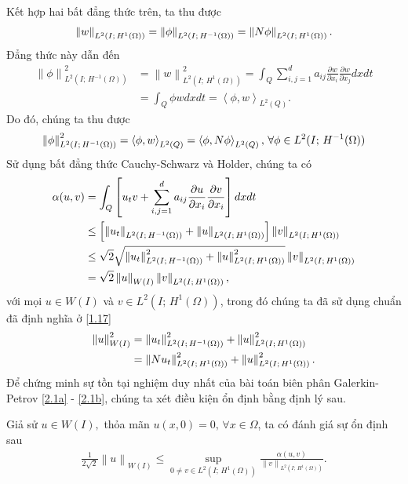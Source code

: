 \documentclass[]{article}
\begin{document}
Kết hợp hai bất đẳng thức trên, ta thu được
\begin{align}\label{2.3}
	\left\|w\right\|_{L^2(I;\, H^1(\Omega))}=\left\|\phi\right\|_{L^2(I;\, H^{-1}(\Omega))}=\left\|\mathnormal{N}\phi\right\|_{L^2(I;\, H^1(\Omega))}.
\end{align}
Đẳng thức này dẫn đến
\begin{align*}
	\left\|\phi\right\|_{L^2(I;\, H^{-1}(\Omega))}^2&=\left\|w\right\|_{L^2(I;\, H^1(\Omega))}^2=\int_{Q}\sum_{i, j=1}^{d}a_{ij}\frac{\partial w}{\partial x_i}\frac{\partial w}{\partial x_j}dxdt\\
	&=\int_{Q}\phi w dxdt=\left\langle\phi, w\right\rangle_{L^2(Q)}.
\end{align*}
Do đó, chúng ta thu được
\begin{align}\label{2.4}
	\left\|\phi\right\|_{L^2(I;\, H^{-1}(\Omega))}^2=\left\langle\phi, w\right\rangle_{L^2(Q)}=\left\langle\phi, \mathnormal{N}\phi\right\rangle_{L^2(Q)},\, \forall \phi \in L^2(I;\, H^{-1}(\Omega))
\end{align}
Sử dụng bất đẳng thức Cauchy-Schwarz và Holder, chúng ta có
\begin{align}
	\alpha(u, v) &= \int_{Q}\left[u_tv+\sum_{i, j=1}^{d}a_{ij}\frac{\partial u}{\partial x_i}\frac{\partial v}{\partial x_i}\right]dxdt \label{2.5}\\
	&\leq \left[\left\|u_t\right\|_{L^2(I;\, H^{-1}(\Omega))}+\left\|u\right\|_{L^2(I;\, H^1(\Omega))}\right]\left\|v\right\|_{L^2(I;\, H^1(\Omega))}\notag\\
	&\leq \sqrt{2}\sqrt{\left\|u_t\right\|_{L^2(I;\, H^{-1}(\Omega))}^2+\left\|u\right\|_{L^2(I;\, H^1(\Omega))}^2}\left\|v\right\|_{L^2(I;\, H^1(\Omega))}\notag\\
	&=\sqrt{2}\left\|u\right\|_{W(I)}\left\|v\right\|_{L^2(I;\, H^1(\Omega))}, \label{2.6}
\end{align}
với mọi $u\in W(I)$ và $v\in L^2(I;\, H^1(\Omega))$, trong đó chúng ta đã sử dụng chuẩn đã định nghĩa ở \eqref{1.17}
\begin{align}
	\left\|u\right\|_{W(I)}^2&=\left\|u_t\right\|_{L^2(I;\, H^{-1}(\Omega))}^2+\left\|u\right\|_{L^2(I;\, H^1(\Omega))}^2 \notag\\
	&=\left\|\mathnormal{N}u_t\right\|_{L^2(I;\, H^1(\Omega))}^2+\left\|u\right\|_{L^2(I;\, H^1(\Omega))}^2. \label{2.7}
\end{align}
Để chứng minh sự tồn tại nghiệm duy nhất của bài toán biên phân Galerkin-Petrov \eqref{2.1a} - \eqref{2.1b}, chúng ta xét điều kiện ổn định bằng định lý sau.
\begin{dl}\label{dl2.1}
	Giả sử $u\in W(I),$ thỏa mãn $u(x, 0)=0, \, \forall x\in \Omega$, ta có đánh giá sự ổn định sau 
	\begin{align}\label{2.8}
		\frac{1}{2\sqrt{2}}\left\|u\right\|_{W(I)}\leq \sup_{0\neq v\in L^2(I;\, H^1(\Omega))}\frac{\alpha(u, v)}{\left\|v\right\|_{L^2(I;\, H^1(\Omega))}}.
	\end{align}
\end{dl}
\end{document}
